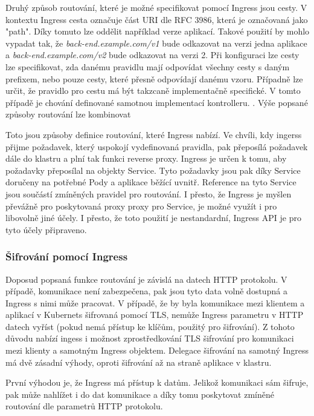 Druhý způsob routování, které je možné specifikovat pomocí Ingress jsou cesty. V kontextu Ingress cesta označuje část URI dle RFC 3986, která je označovaná jako "path". Díky tomuto lze oddělit například verze aplikací. Takové použití by mohlo vypadat tak, že \textit{back-end.example.com/v1} bude odkazovat na verzi jedna aplikace a \textit{back-end.example.com/v2} bude odkazovat na verzi 2. Při konfiguraci lze cesty lze specifikovat, zda danému pravidlu mají odpovídat všechny cesty s daným prefixem, nebo pouze cesty, které přesně odpovídají danému vzoru. Případně lze určit, že pravidlo pro cestu má být takzcaně implementačně specifické. V tomto případě je chování definované samotnou implementací kontrolleru. \cite{thekubernetesauthors_2022_ingress}. Výše popsané způsoby routování lze kombinovat

Toto jsou způsoby definice routování, které Ingress nabízí. Ve chvíli, kdy ingerss přijme požadavek, který uspokojí vydefinovaná pravidla, pak přeposílá požadavek dále do klastru a plní tak funkci reverse proxy. Ingress je určen k tomu, aby požadavky přeposílal na objekty Service. Tyto požadavky jsou pak díky Service doručeny na potřebné Pody a aplikace běžící uvnitř. Reference na tyto Service jsou součástí zmíněných pravidel pro routování. I přesto, že Ingress je myšlen převážně pro poskytovaná proxy proxy pro Service, je možné využít i pro libovolně jiné účely. I přesto, že toto použití je nestandardní, Ingress API je pro tyto účely připraveno.   

\subsubsection{Šifrování pomocí Ingress}
Doposud popsaná funkce routování je závislá na datech HTTP protokolu. V případě, komunikace není zabezpečena, pak jsou tyto data volně dostupná a Ingress s nimi může pracovat. V případě, že by byla komunikace mezi klientem a aplikací v Kubernets šifrovaná pomocí TLS, nemůže Ingress parametru v HTTP datech vyříst (pokud nemá přístup ke klíčům, použitý pro šifrování). Z tohoto důvodu nabízí ingess i možnost zprostředkování TLS šifrování pro komunikaci mezi klienty a samotným Ingress objektem. Delegace šifrování na samotný Ingress má dvě zásadní výhody, oproti šifrování až na straně aplikace v klastru. 

První výhodou je, že Ingress má přístup k datům. Jelikož komunikaci sám šifruje, pak může nahlížet i do dat komunikace a díky tomu poskytovat zmíněné routování dle parametrů HTTP protokolu.

